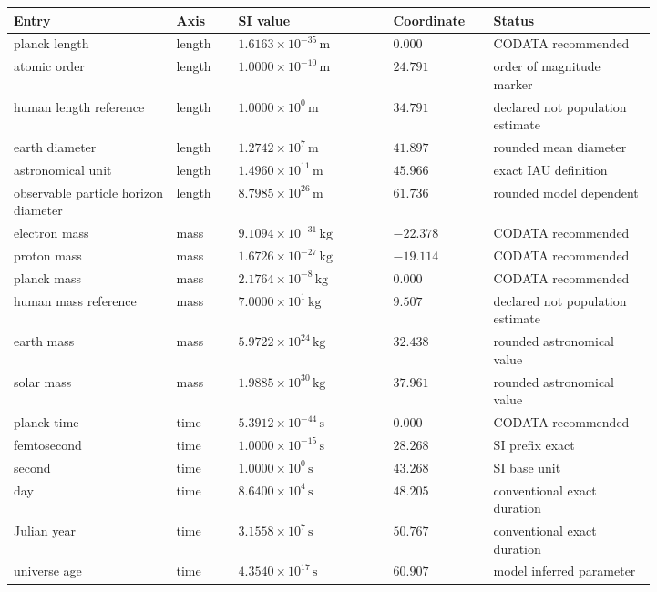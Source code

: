 {\small
\begin{longtable}{L{0.21\linewidth}L{0.08\linewidth}L{0.20\linewidth}L{0.12\linewidth}L{0.21\linewidth}}
\toprule
Entry & Axis & SI value & Coordinate & Status\\
\midrule
\endhead
planck length & length & $1.6163\times 10^{-35}\,\mathrm{m}$ & $0.000$ & CODATA recommended\\
atomic order & length & $1.0000\times 10^{-10}\,\mathrm{m}$ & $24.791$ & order of magnitude marker\\
human length reference & length & $1.0000\times 10^{0}\,\mathrm{m}$ & $34.791$ & declared not population estimate\\
earth diameter & length & $1.2742\times 10^{7}\,\mathrm{m}$ & $41.897$ & rounded mean diameter\\
astronomical unit & length & $1.4960\times 10^{11}\,\mathrm{m}$ & $45.966$ & exact IAU definition\\
observable particle horizon diameter & length & $8.7985\times 10^{26}\,\mathrm{m}$ & $61.736$ & rounded model dependent\\
electron mass & mass & $9.1094\times 10^{-31}\,\mathrm{kg}$ & $-22.378$ & CODATA recommended\\
proton mass & mass & $1.6726\times 10^{-27}\,\mathrm{kg}$ & $-19.114$ & CODATA recommended\\
planck mass & mass & $2.1764\times 10^{-8}\,\mathrm{kg}$ & $0.000$ & CODATA recommended\\
human mass reference & mass & $7.0000\times 10^{1}\,\mathrm{kg}$ & $9.507$ & declared not population estimate\\
earth mass & mass & $5.9722\times 10^{24}\,\mathrm{kg}$ & $32.438$ & rounded astronomical value\\
solar mass & mass & $1.9885\times 10^{30}\,\mathrm{kg}$ & $37.961$ & rounded astronomical value\\
planck time & time & $5.3912\times 10^{-44}\,\mathrm{s}$ & $0.000$ & CODATA recommended\\
femtosecond & time & $1.0000\times 10^{-15}\,\mathrm{s}$ & $28.268$ & SI prefix exact\\
second & time & $1.0000\times 10^{0}\,\mathrm{s}$ & $43.268$ & SI base unit\\
day & time & $8.6400\times 10^{4}\,\mathrm{s}$ & $48.205$ & conventional exact duration\\
Julian year & time & $3.1558\times 10^{7}\,\mathrm{s}$ & $50.767$ & conventional exact duration\\
universe age & time & $4.3540\times 10^{17}\,\mathrm{s}$ & $60.907$ & model inferred parameter\\
\bottomrule
\end{longtable}
}
